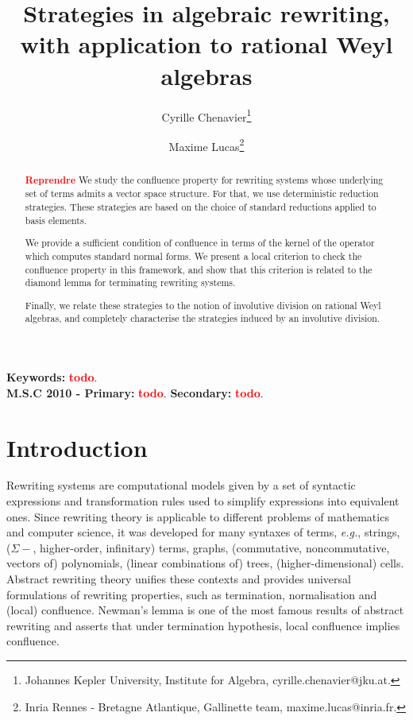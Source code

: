 \documentclass[11pt]{article}
\theoremstyle{definition}
\newcommand\eg{\emph{e.g.}}
\newcommand\todo[1]{{\bf\textcolor{red}{#1}}}
\begin{document}
\title{Strategies in algebraic rewriting, \\ with application to rational Weyl algebras}
\author{Cyrille Chenavier\footnote{
    Johannes Kepler University, Institute for Algebra,
    cyrille.chenavier@jku.at.
  }\and Maxime Lucas\footnote{Inria Rennes - Bretagne Atlantique,
    Gallinette team, maxime.lucas@inria.fr.}
  }
\date{}

\maketitle
      
\begin{abstract}
  \todo{Reprendre}
  We study the confluence property for rewriting systems whose underlying set of
  terms admits a vector space structure. For that, we use deterministic
  reduction strategies. These strategies are based on the choice of standard
  reductions applied to basis elements.

  We provide a sufficient condition of confluence in terms of the kernel of the
  operator which computes standard normal forms. We present a local criterion to
  check the confluence property in this framework, and show that this criterion
  is related to the diamond lemma for terminating rewriting systems.

  Finally, we relate these strategies to the notion of involutive division on
  rational Weyl algebras, and completely characterise the strategies induced by
  an involutive division.
\end{abstract}
\noindent
\begin{small}\textbf{Keywords:} \todo{todo}.\\[0.2cm]
  \textbf{M.S.C 2010 - Primary:} \todo{todo}. \textbf{Secondary:} \todo{todo}.
\end{small}

\tableofcontents

\section{Introduction}

Rewriting systems are computational models given by a set of syntactic
expressions and transformation rules used to simplify expressions into
equivalent ones. Since rewriting theory is applicable to different
problems of mathematics and computer science, it was developed for many
syntaxes of terms, \eg, strings, ($\Sigma-$, higher-order, infinitary)
terms, graphs, (commutative, noncommutative, vectors of) polynomials,
(linear combinations of) trees, (higher-dimensional) cells. Abstract
rewriting theory unifies these contexts and provides universal
formulations of rewriting properties, such as termination, normalisation
and (local) confluence. Newman's lemma is one of the most famous results 
of abstract rewriting and asserts that under termination hypothesis, 
local confluence implies confluence.
\medskip
\end{document}
